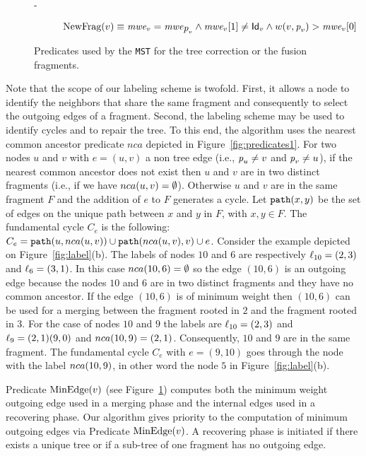 \documentclass[11pt,a4paper]{article}
\newcommand{\id}{\mbox{\sf Id}}
\newcommand{\parent}{\mbox{\it p}}
\newcommand{\lab}{\mbox{\rm $\ell$}}
\newcommand{\m}{\mbox{\it mwe}}
\newcommand{\NewFragment}{\mbox{\rm NewFrag}}
\newcommand{\MinEdge}{\mbox{\rm MinEdge}}
\newcommand{\path}{\mbox{\tt path}}
\newcommand{\Lca}{\mbox{\rm $nca$}}
\newcommand{\MST}{\mbox{\tt MST}}
\begin{document}
\begin{figure}[!ht]
{\begin{minipage}{15cm}
\begin{description}
\item[-] $\NewFragment(v) \equiv \m_v=\m_{\parent_v} \wedge \m_v[1] \neq \id_v \wedge w(v,\parent_v)>\m_v[0]$
\end{description}
\end{minipage}
}
\caption{Predicates used by the \MST\/ for the tree correction or the fusion fragments.}
\label{fig:predicates2}
\end{figure}

Note that the scope of our labeling scheme is twofold. First, it
allows a node to identify the neighbors that share the same fragment
and consequently to select the outgoing edges of a fragment. 
Second, the labeling scheme may be used to identify cycles and
to repair the tree. To this end, the algorithm uses the nearest common
ancestor predicate  \Lca\/ depicted 
in Figure~\ref{fig:predicates1}. For two nodes $u$ and $v$ with
$e=(u,v)$ a non tree edge (i.e., $\parent_u\neq v$ and
$\parent_v\neq u$), if the nearest common ancestor does not exist then
$u$ and $v$ are in two distinct fragments (i.e., if we have $\Lca(u,v)=\emptyset$). Otherwise $u$ and $v$ are in the
same fragment $F$ and the addition of $e$ to $F$ generates a
cycle. Let $\path(x,y)$ be the set of edges on the
unique path between $x$ and $y$ in 
$F$, with $x,y\in F$. The fundamental cycle 
$C_e$ is the following: $C_e=\path(u,\Lca(u,v))\cup \path(\Lca(u,v),v)\cup e$. 
Consider the example depicted on  Figure~\ref{fig:label}(b).
The labels of nodes $10$ and $6$ are respectively  $\lab_{10}=(2,3)$ and
$\lab_{6}=(3,1)$. In this case $\Lca(10,6)=\emptyset$ so the edge
$(10,6)$ is an outgoing edge because the nodes $10$ and $6$ are in two distinct fragments and they have no common ancestor. If the edge $(10,6)$ is of minimum weight then
$(10,6)$ can be used for a merging 
between the fragment rooted in $2$ and the fragment rooted in $3$. 
For the case of nodes $10$ and $9$ the labels are $\lab_{10}=(2,3)$
and $\lab_{9}=(2,1)(9,0)$ and 
$\Lca(10,9)=(2,1)$. Consequently, $10$ and $9$ are in the same fragment. 
The fundamental cycle $C_e$ with $e=(9,10)$ goes through the node with
the label $\Lca(10,9)$, in other word 
the node $5$ in Figure~\ref{fig:label}(b).
 



Predicate $\MinEdge(v)$ (see Figure~\ref{fig:predicates2}) computes both the minimum weight outgoing edge used in a merging phase and the internal edges used in a recovering phase. Our algorithm gives priority to the computation of minimum outgoing edges via Predicate $\MinEdge(v)$. A recovering phase is initiated if there exists a unique tree or if a sub-tree of one fragment has no outgoing edge.
\end{document}
